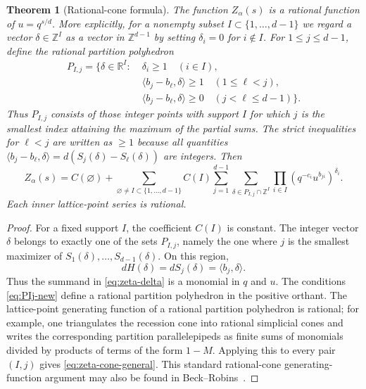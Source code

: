 \documentclass[11pt]{amsart}
\newcommand{\ZZ}{\mathbb Z}
\newcommand{\RR}{\mathbb R}
\theoremstyle{plain}
\newtheorem{theorem}{Theorem}[section]
\theoremstyle{definition}
\numberwithin{equation}{section}
\begin{document}
\begin{theorem}[Rational-cone formula]\label{thm:zeta-rational}
The function $Z_\alpha(s)$ is a rational function of $u=q^{s/d}$.  More explicitly, for a
nonempty subset $I\subset\{1,\ldots,d-1\}$ we regard a vector $\delta\in\ZZ^I$ as a vector
in $\ZZ^{d-1}$ by setting $\delta_i=0$ for $i\notin I$.  For $1\le j\le d-1$, define the
rational partition polyhedron
\begin{align}
  P_{I,j}=\bigl\{\delta\in\RR^I:\;&\delta_i\ge1\quad (i\in I),\nonumber\\
  &\langle b_j-b_\ell,\delta\rangle\ge1\quad (1\le\ell<j),\nonumber\\
  &\langle b_j-b_\ell,\delta\rangle\ge0\quad (j<\ell\le d-1)\bigr\}.\label{eq:PIj-new}
\end{align}
Thus $P_{I,j}$ consists of those integer points with support $I$ for which $j$ is the
smallest index attaining the maximum of the partial sums.  The strict inequalities for
$\ell<j$ are written as $\ge1$ because all quantities
$\langle b_j-b_\ell,\delta\rangle=d(S_j(\delta)-S_\ell(\delta))$ are integers.  Then
\begin{equation}\label{eq:zeta-cone-general}
  Z_\alpha(s)
  =C(\varnothing)+
  \sum_{\varnothing\ne I\subset\{1,\ldots,d-1\}}C(I)
  \sum_{j=1}^{d-1}
  \sum_{\delta\in P_{I,j}\cap\ZZ^I}
  \prod_{i\in I}(q^{-c_i}u^{b_{ji}})^{\delta_i}.
\end{equation}
Each inner lattice-point series is rational.
\end{theorem}

\begin{proof}
For a fixed support $I$, the coefficient $C(I)$ is constant.  The integer vector
$\delta$ belongs to exactly one of the sets $P_{I,j}$, namely the one where $j$ is the
smallest maximizer of $S_1(\delta),\ldots,S_{d-1}(\delta)$.  On this region,
\[
  dH(\delta)=dS_j(\delta)=\langle b_j,\delta\rangle.
\]
Thus the summand in \eqref{eq:zeta-delta} is a monomial in $q$ and $u$.  The conditions
\eqref{eq:PIj-new} define a rational partition polyhedron in the positive orthant.  The
lattice-point generating function of a rational partition polyhedron is rational; for
example, one triangulates the recession cone into rational simplicial cones and writes the
corresponding partition parallelepipeds as finite sums of monomials divided by products of
terms of the form $1-M$.  Applying this to every pair $(I,j)$ gives
\eqref{eq:zeta-cone-general}.
This standard rational-cone generating-function argument may also be found in
Beck--Robins~\cite{BeckRobins}.
\end{proof}
\end{document}
